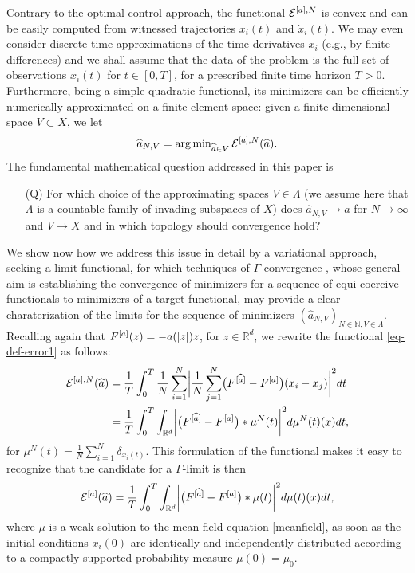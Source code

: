 Contrary to the optimal control approach, the functional $\mathcal E^{[a],N}$ is convex and can be easily computed from witnessed trajectories $x_i(t)$ and $\dot x_i(t)$. We may even consider discrete-time approximations of the time derivatives $\dot x_i$ (e.g., by finite differences) and we shall assume that the data of the problem is the full set of observations $x_i(t)$ for $t \in [0,T]$, for a prescribed finite time horizon $T>0$. Furthermore, being a simple quadratic functional, its minimizers can be efficiently numerically approximated on a finite element space: given a finite dimensional space $V \subset X$, we let
\begin{equation}\label{fdproxy}
\widehat a_{N,V} = \operatorname{arg\,min}_{\widehat a \in V} \mathcal E^{[a],N}(\widehat a).
\end{equation}
The fundamental mathematical question addressed in this paper is
\begin{itemize}
\item[(Q)] For which choice of the approximating spaces $V \in \Lambda$ (we assume here that $\Lambda$ is a countable family of invading subspaces of $X$) does $\widehat a_{N,V} \to a$ for $N \to \infty$ and $V \to X$ and in which topology should convergence hold?
\end{itemize}
We show now how we address this issue in detail by a variational approach, seeking a limit functional, for which techniques of $\Gamma$-convergence \cite{MR1201152}, whose general aim is establishing the convergence of minimizers for a sequence of equi-coercive functionals to minimizers of a target functional, may provide a clear charaterization of the limits for the sequence of minimizers $(\widehat a_{N,V})_{N \in \mathbb N, V \in \Lambda}$.
Recalling again that $F^{[a]}(z) =-a(| z |)z$, for $z \in \mathbb R^{d}$, we rewrite the functional \eqref{eq-def-error1} as follows:
\begin{align}\label{pirlo}
	\begin{split}
	\mathcal E^{[a],N}(\widehat a) & = \frac{1}{T}\int_0^T\frac{1}{N}\sum_{i=1}^N\biggl|\frac{1}{N}\sum_{j=1}^N
			\bigl(F^{[\widehat a]}-F^{[a]}\bigr)(x_i-x_j)\biggr|^2 dt\\
			& = \frac{1}{T}\int_0^T \int_{\mathbb{R}^d} \biggl|\bigl(F^{[\widehat a]}-F^{[a]}\bigr)\ast\mu^N(t)\biggr|^2d\mu^N(t)(x)dt,
	\end{split}
\end{align}
for $\mu^N(t) = \frac{1}{N}\sum^N_{i = 1} \delta_ {x_i(t)}$.
This formulation of the functional makes it easy to recognize that the candidate for a $\Gamma$-limit  is then
\begin{align}\label{ourfunctional}
	\mathcal E^{[a]}(\widehat a)=\frac{1}{T}\int_0^T \int_{\mathbb{R}^d} \biggl|\bigl(F^{[\widehat a]}-F^{[a]}\bigr)\ast\mu(t)\biggr|^2d\mu(t)(x)dt,
\end{align}
where $\mu$ is a weak solution to the mean-field equation \eqref{meanfield}, as soon as the initial conditions $x_i(0)$ are identically and independently 
distributed according to a compactly supported probability measure $\mu(0)=\mu_0$. 

